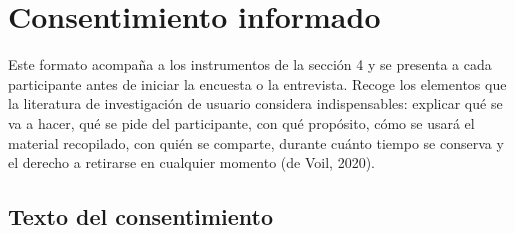 \section{Consentimiento informado}

Este formato acompaña a los instrumentos de la sección 4 y se presenta a cada participante
antes de iniciar la encuesta o la entrevista. Recoge los elementos que la literatura de
investigación de usuario considera indispensables: explicar qué se va a hacer, qué se pide del
participante, con qué propósito, cómo se usará el material recopilado, con quién se comparte,
durante cuánto tiempo se conserva y el derecho a retirarse en cualquier momento
(de Voil, 2020).

\subsection{Texto del consentimiento}

